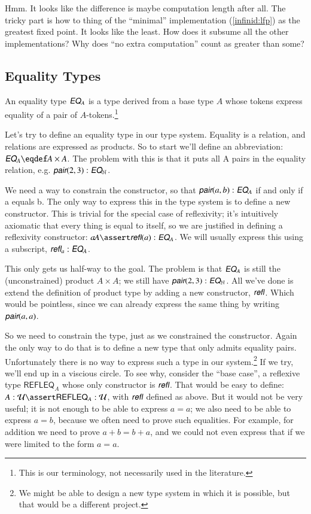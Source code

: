 Hmm. It looks like the difference is maybe computation length after
all. The tricky part is how to thing of the ``minimal'' implementation
(\ref{infinid:lfp}) as the greatest fixed point. It looks like the
least. How does it subsume all the other implementations? Why does
``no extra computation'' count as greater than some?

\subsection{Equality Types}
An equality type \(\EQ_A\) is a type derived from a base type \(A\)
whose tokens express equality of a pair of \(A\)-tokens.\footnote{This is our terminology, not necessarily used in the literature.}

Let's try to define an equality type in our type system. Equality is a
relation, and relations are expressed as products. So to start we'll
define an abbreviation: \(\EQ_A\defeq A\times A\). The problem with
this is that it puts all A pairs in the equality relation, e.g.
\(\pair(2,3):\EQ_{\Nat}\).

We need a way to constrain the constructor, so that
\(\pair(a,b):\EQ_A\) if and only if a equals b. The only way to
express this in the type system is to define a new constructor. This
is trivial for the special case of reflexivity; it's intuitively
axiomatic that every thing is equal to itself, so we are justified in
defining a reflexivity constructor: \(a\type A\linfer\refl(a):\EQ_A\).
We will usually express this using a subscript, \(\refl_a:\EQ_A\).

This only gets us half-way to the goal. The problem is that \(\EQ_A\)
is still the (unconstrained) product \(A\times A\); we still have
\(\pair(2,3):\EQ_{\Nat}\). All we've done is extend the definition of
product type by adding a new constructor, \(\refl\). Which would be
pointless, since we can already express the same thing by writing
\(\pair(a,a)\).

So we need to constrain the type, just as we constrained the
constructor. Again the only way to do that is to define a new type
that only admits equality pairs. Unfortunately there is no way to
express such a type in our system.\footnote{We might be able to design
a new type system in which it is possible, but that would be a
different project.} If we try, we'll end up in a viscious circle. To
see why, consider the ``base case'', a reflexive type
\(\textsf{REFLEQ}_A\) whose only constructor is \(\refl\). That
would be easy to define: \(A:\Univ\linfer \textsf{REFLEQ}_A:\Univ\),
with \(\refl\) defined as above. But it would not be very useful; it
is not enough to be able to express \(a=a\); we also need to be able
to express \(a=b\), because we often need to prove such equalities.
For example, for addition we need to prove \(a+b = b+a\), and we could
not even express that if we were limited to the form \(a=a\).

